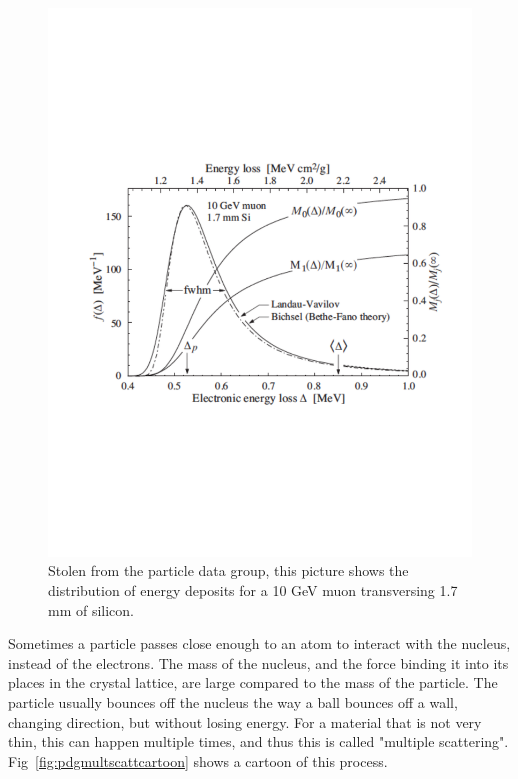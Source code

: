 \begin{figure}[h]
\centering\includegraphics[scale=0.5]{./particleinteractions/Pictures/landau.pdf}
\caption{Stolen from the particle data group, this picture shows the distribution of energy deposits for a 10 GeV muon transversing 1.7 mm of silicon. }
\label{fig:landau}
\end{figure}

Sometimes a particle passes close enough to an atom to interact with the nucleus, instead of the electrons.  The mass of the nucleus, and the force binding it into its places in the crystal lattice, are large compared to the mass of the particle.  The particle usually bounces off the nucleus the way a ball bounces off a wall, changing direction, but without losing energy.  For a material that is not very thin, this can happen multiple times, and thus this is called "multiple scattering".  Fig~\ref{fig:pdgmultscattcartoon} shows a cartoon of this process.


